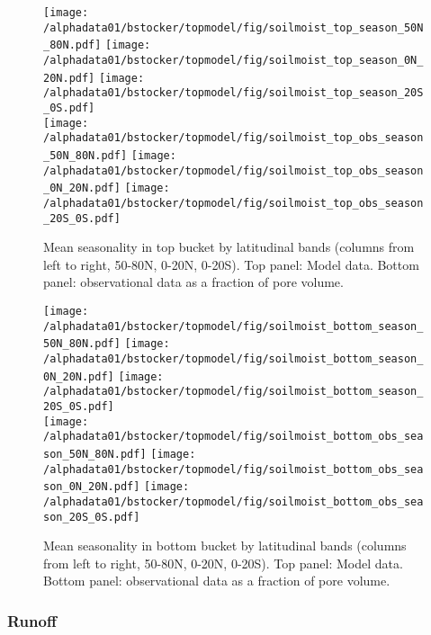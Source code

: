 \begin{figure}[ht!]
\begin{center}
  \texttt{[image: /alphadata01/bstocker/topmodel/fig/soilmoist\_top\_season\_50N\_80N.pdf]}
  \texttt{[image: /alphadata01/bstocker/topmodel/fig/soilmoist\_top\_season\_0N\_20N.pdf]}
  \texttt{[image: /alphadata01/bstocker/topmodel/fig/soilmoist\_top\_season\_20S\_0S.pdf]}\\
  \texttt{[image: /alphadata01/bstocker/topmodel/fig/soilmoist\_top\_obs\_season\_50N\_80N.pdf]}
  \texttt{[image: /alphadata01/bstocker/topmodel/fig/soilmoist\_top\_obs\_season\_0N\_20N.pdf]}
  \texttt{[image: /alphadata01/bstocker/topmodel/fig/soilmoist\_top\_obs\_season\_20S\_0S.pdf]}\\
\end{center}
\caption{Mean seasonality in top bucket by latitudinal bands (columns from left to right, 50-80\degrees N, 0-20\degrees N, 0-20\degrees S). Top panel: Model data. Bottom panel: observational data as a fraction of pore volume.}
\label{fig:season_top}
\end{figure}

\begin{figure}[ht!]
\begin{center}
  \texttt{[image: /alphadata01/bstocker/topmodel/fig/soilmoist\_bottom\_season\_50N\_80N.pdf]}
  \texttt{[image: /alphadata01/bstocker/topmodel/fig/soilmoist\_bottom\_season\_0N\_20N.pdf]}
  \texttt{[image: /alphadata01/bstocker/topmodel/fig/soilmoist\_bottom\_season\_20S\_0S.pdf]}\\
  \texttt{[image: /alphadata01/bstocker/topmodel/fig/soilmoist\_bottom\_obs\_season\_50N\_80N.pdf]}
  \texttt{[image: /alphadata01/bstocker/topmodel/fig/soilmoist\_bottom\_obs\_season\_0N\_20N.pdf]}
  \texttt{[image: /alphadata01/bstocker/topmodel/fig/soilmoist\_bottom\_obs\_season\_20S\_0S.pdf]}\\
\end{center}
\caption{Mean seasonality in bottom bucket by latitudinal bands (columns from left to right, 50-80\degrees N, 0-20\degrees N, 0-20\degrees S). Top panel: Model data. Bottom panel: observational data as a fraction of pore volume.}
\label{fig:season_bottom}
\end{figure}


\clearpage
\subsubsection{Runoff}

